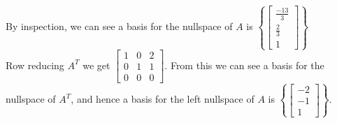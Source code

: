 \documentclass[10pt,english]{article}
\begin{document}
\begin{enumerate}
\begin{enumerate}
By inspection, we can see a basis for the nullspace of $A$ is $\left\{\begin{bmatrix}\frac{-13}{3}\\\frac{2}{3}\\1\end{bmatrix}\right\}$\\ 
Row reducing $A^T$ we get $\begin{bmatrix}1&0&2\\0&1&1\\0&0&0\end{bmatrix}$. From this we can see a basis for the nullspace of $A^T$, and hence a basis for the left nullspace of $A$ is $\left\{\begin{bmatrix}-2\\-1\\1\end{bmatrix}\right\}$.\pagebreak


\end{enumerate}
\end{enumerate}
\end{document}
